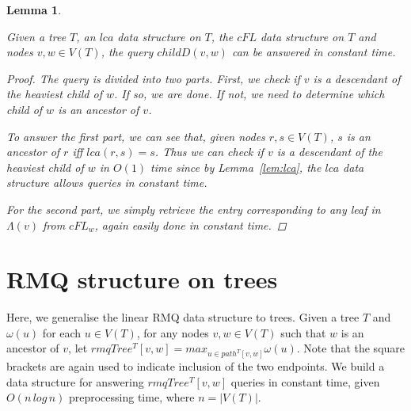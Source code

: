 \documentclass{article}
\newcommand{\leafset}{\Lambda}
\newcommand{\weight}{\omega}
\newtheorem{cfdquery}[incompatibility]{Lemma}
\begin{document}
    \medskip
    \begin{cfdquery}
        \label{lem:cfdquery}

        Given a tree $T$, an $lca$ data structure on $T$, the $cFL$ data structure on $T$ and nodes $v, w \in V(T)$, the query $childD(v, w)$ can be answered in constant time.

        \begin{proof}
            The query is divided into two parts. First, we check if $v$ is a descendant of the heaviest child of $w$. If so, we are done. If not, we need to determine which child of $w$ is an ancestor of $v$.

            To answer the first part, we can see that, given nodes $r, s \in V(T)$, $s$ is an ancestor of $r$ iff $lca(r, s) = s$. Thus we can check if $v$ is a descendant of the heaviest child of $w$ in $O(1)$ time since by Lemma~\ref{lem:lca}, the $lca$ data structure allows queries in constant time.

            For the second part, we simply retrieve the entry corresponding to any leaf in $\leafset(v)$ from $cFL_w$, again easily done in constant time.
        \end{proof}
    \end{cfdquery}

    \section{RMQ structure on trees}
    \label{sec:rmqtree}

    Here, we generalise the linear RMQ data structure to trees. Given a tree $T$ and $\weight(u)$ for each $u \in V(T)$, for any nodes $v, w \in V(T)$ such that $w$ is an ancestor of $v$, let $rmqTree^T[v, w] = max_{u \in path^T[v, w]}\weight(u)$. Note that the square brackets are again used to indicate inclusion of the two endpoints. We build a data structure for answering $rmqTree^T[v, w]$ queries in constant time, given $O(n\,log\,n)$ preprocessing time, where $n = |V(T)|$.
\end{document}
